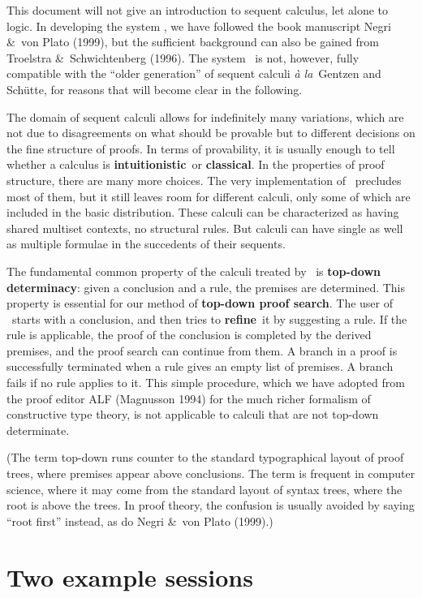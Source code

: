 This document will not give an introduction to sequent calculus, let alone to
logic. In developing the system \PESC, we have followed the book manuscript
Negri \&\ von Plato (1999), but the
sufficient background can also be gained from Troelstra \&\ Schwichtenberg
(1996). The system \PESC\ is not, however, fully compatible with the 
``older generation'' of sequent calculi {\em \`a la}\ Gentzen and Sch\"utte,
for reasons that will become clear in the following.

The domain of sequent calculi allows for indefinitely many variations, which are
not due to disagreements on what should be provable but to different decisions on
the fine structure of proofs. In terms of provability, it is usually enough to tell
whether a calculus is {\bf intuitionistic}\ or {\bf classical}. In the properties of
proof structure, there are many more choices. The very implementation of \PESC\
precludes most of them, but it still leaves room for different calculi, only some of
which are included in the basic distribution. These calculi can be characterized as
having
\bece
shared multiset contexts, no structural rules.
\ence
But calculi can have single as well as multiple formulae in the succedents
of their sequents. 

The fundamental common property of the calculi treated by 
\PESC\ is {\bf top-down determinacy}:
\bece
given a conclusion and a rule, the premises are determined.
\ence
This property is essential for our method of {\bf top-down proof search}. The user
of \PESC\ starts with a conclusion, and then tries to {\bf refine}\ it by suggesting
a rule. If the rule is applicable, the proof of the conclusion is completed by
the derived premises, and the proof search can continue from them. A branch in a
proof is successfully terminated when a rule gives an empty list of premises.
A branch fails if no rule applies to it. This simple procedure, which we have 
adopted from the proof editor ALF (Magnusson 1994) for the much richer formalism of 
constructive type theory, is not applicable to calculi that are not top-down 
determinate.

(The term top-down runs counter to the standard typographical layout of proof 
trees, where premises appear above conclusions.
The term is frequent in computer science, where it may come from the
standard layout of syntax trees, where the root is above the trees.
In proof theory, the confusion is usually avoided by saying ``root first'' instead,
as do Negri \&\ von Plato (1999).)


\section{Two example sessions}

